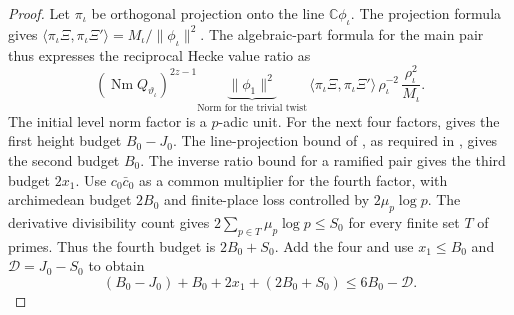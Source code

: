 \begin{proof}
Let $\pi_\iota$ be orthogonal projection onto the line $\mathbb C\phi_\iota$. The projection formula gives $\langle\pi_\iota\Xi,\pi_\iota\Xi'\rangle=M_\iota/\|\phi_\iota\|^2$. The algebraic-part formula for the main pair thus expresses the reciprocal Hecke value ratio as
\[
 (\operatorname{Nm} Q_{\vartheta_\iota})^{2z-1}
 \underbrace{\|\phi_1\|^2}_{\text{Norm for the trivial twist}}\,
 \langle\pi_\iota\Xi,\pi_\iota\Xi'\rangle\,
 \rho_\iota^{-2}\,\frac{\rho_\iota^2}{M_\iota}.
\]
The initial level norm factor is a $p$-adic unit. For the next four factors,  gives the first height budget $B_0-J_0$. The line-projection bound of , as required in , gives the second budget $B_0$. The inverse ratio bound for a ramified pair gives the third budget $2x_1$. Use $c_0\bar c_0$ as a common multiplier for the fourth factor, with archimedean budget $2B_0$ and finite-place loss controlled by $2\mu_p\log p$. The derivative divisibility count gives $2\sum_{p\in T}\mu_p\log p\le S_0$ for every finite set $T$ of primes. Thus the fourth budget is $2B_0+S_0$. Add the four and use $x_1\le B_0$ and $\mathcal D=J_0-S_0$ to obtain
\[
 (B_0-J_0)+B_0+2x_1+(2B_0+S_0)
 \le6B_0-\mathcal D .
\]
\end{proof}

